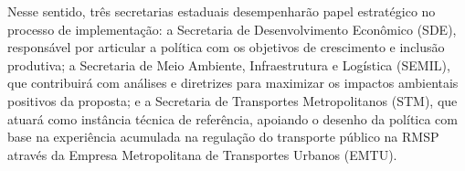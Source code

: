 Nesse sentido, três secretarias estaduais desempenharão papel estratégico no processo de implementação: a Secretaria de Desenvolvimento Econômico (SDE), responsável por articular a política com os objetivos de crescimento e inclusão produtiva; a Secretaria de Meio Ambiente, Infraestrutura e Logística (SEMIL), que contribuirá com análises e diretrizes para maximizar os impactos ambientais positivos da proposta; e a Secretaria de Transportes Metropolitanos (STM), que atuará como instância técnica de referência, apoiando o desenho da política com base na experiência acumulada na regulação do transporte público na RMSP através da Empresa Metropolitana de Transportes Urbanos (EMTU).
